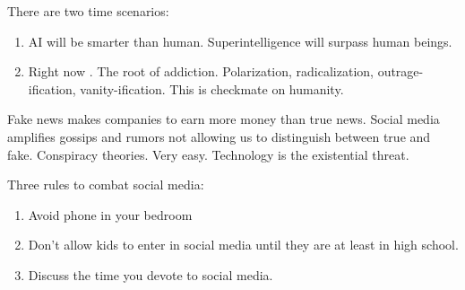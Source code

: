   
There are two time scenarios:  
\begin{enumerate} 
\setlength\itemsep{0cm}
\item AI will be smarter than human. Superintelligence will surpass human beings. 
\item Right now . The root of addiction.
Polarization, radicalization, outrage-ification, vanity-ification. 
This is checkmate on humanity. 
\end{enumerate}  
  
  
  
  
Fake news makes companies to earn more money than true news. 
Social media amplifies gossips and rumors not allowing us 
to distinguish between true and fake. 
Conspiracy theories. Very easy. 
Technology is the existential threat.   
%  
%  
%  
%  
%  
%  
%  

  
%  
%  
%  
% 

  
   
Three rules to combat social media:
\begin{enumerate} 
\setlength\itemsep{0cm}
\item Avoid phone in your bedroom
\item Don't allow kids to enter in social media until they are at least in high school. 
\item Discuss the time you devote to social media. 
\end{enumerate} 

